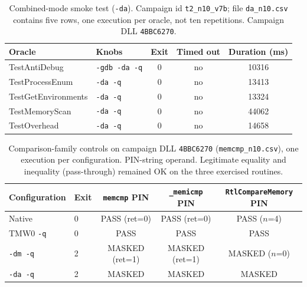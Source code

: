\begin{table}[!t]
\centering
\caption{Combined-mode smoke test (\texttt{-da}). Campaign id \texttt{t2\_n10\_v7b}; file \texttt{da\_n10.csv} contains five rows, one execution per oracle, not ten repetitions. Campaign DLL \texttt{4BBC6270}.}
\label{tab:da_smoke}
\begin{tabular}{llccc}
\hline
Oracle & Knobs & Exit & Timed out & Duration (ms) \\
\hline
TestAntiDebug & \texttt{-gdb -da -q} & 0 & no & 10316 \\
TestProcessEnum & \texttt{-da -q} & 0 & no & 13413 \\
TestGetEnvironments & \texttt{-da -q} & 0 & no & 13324 \\
TestMemoryScan & \texttt{-da -q} & 0 & no & 44062 \\
TestOverhead & \texttt{-da -q} & 0 & no & 14658 \\
\hline
\end{tabular}
\end{table}


\begin{table}[!t]
\centering
\caption{Comparison-family controls on campaign DLL \texttt{4BBC6270} (\texttt{memcmp\_n10.csv}), one execution per configuration. PIN-string operand. Legitimate equality and inequality (pass-through) remained OK on the three exercised routines.}
\label{tab:memcmp_family}
\begin{tabular}{llccc}
\hline
Configuration & Exit & \texttt{memcmp} PIN & \texttt{\_memicmp} PIN & \texttt{RtlCompareMemory} PIN \\
\hline
Native & 0 & PASS (ret=0) & PASS (ret=0) & PASS ($n$=4) \\
TMW0 \texttt{-q} & 0 & PASS & PASS & PASS \\
\texttt{-dm -q} & 2 & MASKED (ret=1) & MASKED (ret=1) & MASKED ($n$=0) \\
\texttt{-da -q} & 2 & MASKED & MASKED & MASKED \\
\hline
\end{tabular}
\end{table}

